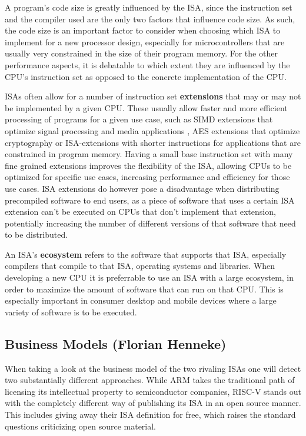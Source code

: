 \documentclass[conference]{IEEEtran}
\begin{document}
A program's code size is greatly influenced by the \gls{ISA}, since the instruction set and the compiler used are the only two factors that influence
code size. As such, the code size is an important factor to consider when choosing which \gls{ISA} to implement for a new processor design, especially
for microcontrollers that are usually very constrained in the size of their program memory.
For the other performance aspects, it is debatable to which extent they are influenced by the \gls{CPU}'s instruction set as opposed
to the concrete implementation of the CPU. \cite{Blem2013} \cite{Akram2017}

\glspl{ISA} often allow for a number of instruction set \textbf{extensions} that may or may not be implemented by a given \gls{CPU}. These usually allow
faster and more efficient processing of programs for a given use case, such as \gls{SIMD} extensions that optimize signal processing and media applications \cite[page 52]{Arm2020},
\gls{AES} extensions that optimize cryptography \cite{Arm2015} or \gls{ISA}-extensions with shorter instructions for applications that are constrained in program memory. \cite{Arm2005}
Having a small base instruction set with many fine grained extensions improves the flexibility of the \gls{ISA}, allowing \glspl{CPU} to be optimized for specific
use cases, increasing performance and efficiency for those use cases. \gls{ISA} extensions do however pose a disadvantage when distributing precompiled software
to end users, as a piece of software that uses a certain \gls{ISA} extension can't be executed on \glspl{CPU} that don't implement that extension, potentially
increasing the number of different versions of that software that need to be distributed.

An \gls{ISA}'s \textbf{ecosystem} refers to the software that supports that \gls{ISA}, especially compilers that compile to that \gls{ISA}, operating systems and libraries.
When developing a new \gls{CPU} it is preferrable to use an \gls{ISA} with a large ecosystem, in order to maximize the amount of software
that can run on that \gls{CPU}. This is especially important in consumer desktop and mobile devices where a large variety of software is to be executed.

	\subsection{Business Models (Florian Henneke)}
	\label{businessModels}
	When taking a look at the business model of the two rivaling \glspl{ISA} one will detect two substantially different approaches. While ARM takes the traditional path of licensing its intellectual property to semiconductor companies, RISC-V stands out with the completely different way of publishing its \gls{ISA} in an open source manner. This includes giving away their \gls{ISA} definition for free, which raises the standard questions criticizing open source material.
\end{document}
